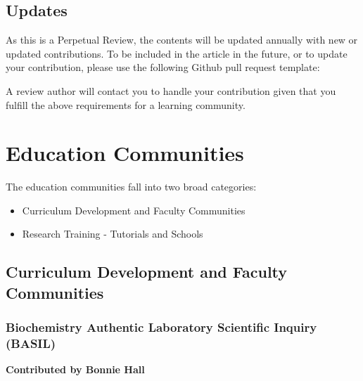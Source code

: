 \documentclass[9pt,review]{livecoms}
\begin{document}
\subsection{Updates}
As this is a Perpetual Review, the contents will be updated annually with new or updated contributions. To be included in the article in the future, or to update your contribution, please use the following Github pull request template:


A review author will contact you to handle your contribution given that you fulfill the above requirements for a learning community. 

\section{Education Communities}

The education communities fall into two broad categories:
\begin{itemize}
    \item Curriculum Development and Faculty Communities
    \item Research Training - Tutorials and Schools
\end{itemize}

\subsection{Curriculum Development and Faculty Communities}

\subsubsection{Biochemistry Authentic Laboratory Scientific Inquiry (BASIL)}

\textbf{Contributed by Bonnie Hall}
\end{document}

